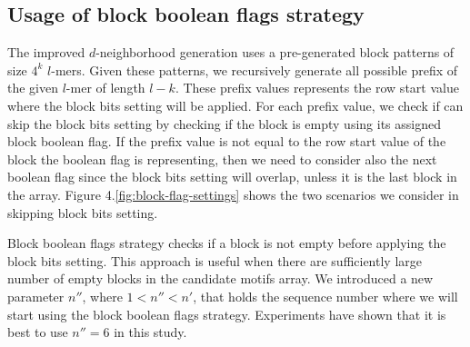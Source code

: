 \subsection{Usage of block boolean flags strategy}

The improved $d$-neighborhood generation uses a pre-generated block patterns of size $4^k$ $l$-mers. Given these patterns, we recursively generate all possible prefix of the given $l$-mer of length $l - k$. These prefix values represents the row start value where the block bits setting will be applied. For each prefix value, we check if can skip the block bits setting by checking if the block is empty using its assigned block boolean flag. If the prefix value is not equal to the row start value of the block the boolean flag is representing, then we need to consider also the next boolean flag since the block bits setting will overlap, unless it is the last block in the array. Figure 4.\ref{fig:block-flag-settings} shows the two scenarios we consider in skipping block bits setting.


Block boolean flags strategy checks if a block is not empty before applying the block bits setting. This approach is useful when there are sufficiently large number of empty blocks in the candidate motifs array. We introduced a new parameter $n''$, where $1 < n'' < n'$, that holds the sequence number where we will start using the block boolean flags strategy. Experiments have shown that it is best to use $n'' = 6$ in this study.



